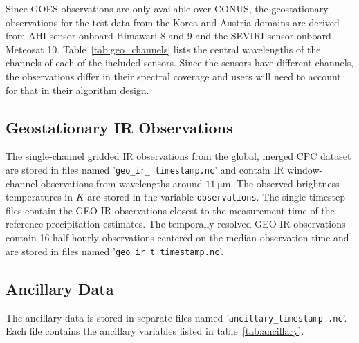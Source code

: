 \documentclass[11pt]{article}
\begin{document}
Since GOES observations are only available over CONUS, the geostationary
observations for the test data from the Korea and Austria domains are derived
from AHI sensor onboard Himawari 8 and 9 and the SEVIRI sensor onboard Meteosat
10. Table~\ref{tab:geo_channels} lists the central wavelengths of the
channels of each of the included sensors. Since the sensors have different
channels, the observations differ in their spectral coverage and users will need
to account for that in their algorithm design.

\subsection{Geostationary IR Observations}

The single-channel gridded IR observations from the global, merged CPC dataset
\citep{NCEP_CPC_L3_IR} are stored in files named '\texttt{geo\_ir\_\textlangle
	timestamp\textrangle.nc}' and contain IR window-channel observations from
wavelengths around $\SI{11}{\micro \meter}$. The observed brightness
temperatures in $\si{K}$ are stored in the variable \texttt{observations}. The
single-timestep files contain the GEO IR observations closest to the
measurement time of the reference precipitation estimates. The
temporally-resolved GEO IR observations contain 16 half-hourly observations
centered on the median observation time and are stored in files named
'\texttt{geo\_ir\_t\_\textlangle timestamp\textrangle.nc}'.

\subsection{Ancillary Data}

The ancillary data is stored in separate files named
'\texttt{ancillary\_\textlangle timestamp \textrangle.nc}'. Each file contains
the ancillary variables listed in table~\ref{tab:ancillary}.
\end{document}
